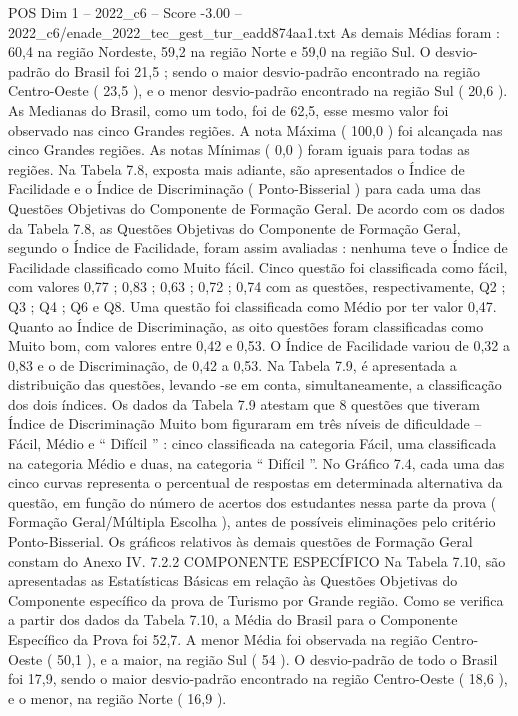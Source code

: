 \begin{textsample}{POS Dim 1 – 2022\_c6 – Score -3.00 – 2022\_c6/enade\_2022\_tec\_gest\_tur\_eadd874aa1.txt}
As demais Médias foram : 60,4 na região Nordeste, 59,2 na região Norte e 59,0 na região Sul.
O desvio-padrão do Brasil foi 21,5 ; sendo o maior desvio-padrão encontrado na região Centro-Oeste ( 23,5 ), e o menor desvio-padrão encontrado na região Sul ( 20,6 ).
As Medianas do Brasil, como um todo, foi de 62,5, esse mesmo valor foi observado nas cinco Grandes regiões.
A nota Máxima ( 100,0 ) foi alcançada nas cinco Grandes regiões.
As notas Mínimas ( 0,0 ) foram iguais para todas as regiões.
Na Tabela 7.8, exposta mais adiante, são apresentados o Índice de Facilidade e o Índice de Discriminação ( Ponto-Bisserial ) para cada uma das Questões Objetivas do Componente de Formação Geral.
De acordo com os dados da Tabela 7.8, as Questões Objetivas do Componente de Formação Geral, segundo o Índice de Facilidade, foram assim avaliadas : nenhuma teve o Índice de Facilidade classificado como Muito fácil.
Cinco questão foi classificada como fácil, com valores 0,77 ; 0,83 ; 0,63 ; 0,72 ; 0,74 com as questões, respectivamente, Q2 ; Q3 ; Q4 ; Q6 e Q8.
Uma questão foi classificada como Médio por ter valor 0,47.
Quanto ao Índice de Discriminação, as oito questões foram classificadas como Muito bom, com valores entre 0,42 e 0,53.
O Índice de Facilidade variou de 0,32 a 0,83 e o de Discriminação, de 0,42 a 0,53.
Na Tabela 7.9, é apresentada a distribuição das questões, levando -se em conta, simultaneamente, a classificação dos dois índices.
Os dados da Tabela 7.9 atestam que 8 questões que tiveram Índice de Discriminação Muito bom figuraram em três níveis de dificuldade – Fácil, Médio e “ Difícil ” : cinco classificada na categoria Fácil, uma classificada na categoria Médio e duas, na categoria “ Difícil ”.
No Gráfico 7.4, cada uma das cinco curvas representa o percentual de respostas em determinada alternativa da questão, em função do número de acertos dos estudantes nessa parte da prova ( Formação Geral/Múltipla Escolha ), antes de possíveis eliminações pelo critério Ponto-Bisserial.
Os gráficos relativos às demais questões de Formação Geral constam do Anexo IV. 7.2.2 COMPONENTE ESPECÍFICO Na Tabela 7.10, são apresentadas as Estatísticas Básicas em relação às Questões Objetivas do Componente específico da prova de Turismo por Grande região.
Como se verifica a partir dos dados da Tabela 7.10, a Média do Brasil para o Componente Específico da Prova foi 52,7.
A menor Média foi observada na região Centro-Oeste ( 50,1 ), e a maior, na região Sul ( 54 ).
O desvio-padrão de todo o Brasil foi 17,9, sendo o maior desvio-padrão encontrado na região Centro-Oeste ( 18,6 ), e o menor, na região Norte ( 16,9 ).

\end{textsample}

